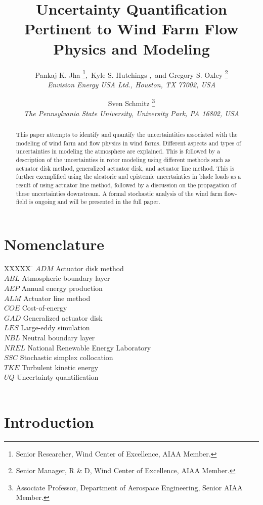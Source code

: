 \documentclass[]{aiaa-tc}%
\title{Uncertainty Quantification Pertinent to Wind Farm Flow Physics and Modeling}
\author{
    Pankaj K. Jha%
    \thanks{Senior Researcher, Wind Center of Excellence, AIAA Member.},\
    Kyle S. Hutchings%
   \thanksibid{1},\ and 
    Gregory S. Oxley%
   \thanks{Senior Manager, R \& D, Wind Center of Excellence, AIAA Member.}\\
  {\normalsize\itshape
   Envision Energy USA Ltd., Houston, TX 77002, USA}\\
  \and
  Sven Schmitz %
   \thanks{Associate Professor, Department of Aerospace Engineering, Senior AIAA Member.}\\
  {\normalsize\itshape
  The Pennsylvania State University, University Park, PA 16802, USA}
 }
\begin{document}
\maketitle

\begin{abstract}
This paper attempts to identify and quantify the uncertaintities associated with the modeling of wind farm and flow physics in wind farms. Different aspects and types of uncertainties in modeling the atmosphere are explained. This is followed by a description of the uncertainties in rotor modeling using different methods such as actuator disk method, generalized actuator disk, and actuator line method. This is further exemplified using the aleatoric and epistemic uncertainties in blade loads as a result of using actuator line method, followed by a discussion on the propagation of these uncertainties downstream. A formal stochastic analysis of the wind farm flow-field is ongoing and will be presented in the full paper.    
\end{abstract}

\section*{Nomenclature}

\begin{tabbing}
  XXXXX \= \kill%
  $ADM$ \> Actuator disk method \\
  $ABL$ \> Atmospheric boundary layer \\
  $AEP$ \> Annual energy production \\
  $ALM$ \> Actuator line method \\
  $COE$ \> Cost-of-energy \\
  $GAD$ \> Generalized actuator disk \\
  $LES$ \> Large-eddy simulation \\
  $NBL$ \> Neutral boundary layer \\
  $NREL$ \> National Renewable Energy Laboratory \\
  $SSC$ \> Stochastic simplex collocation \\
  $TKE$ \> Turbulent kinetic energy \\
  $UQ$ \> Uncertainty quantification \\
  $$ \>
 \end{tabbing}

\section{Introduction}
\end{document}
